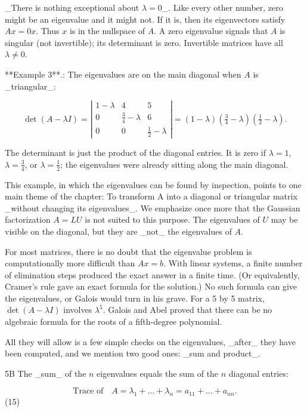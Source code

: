 _There is nothing exceptional about \(\lambda=0\)_. Like every other number, zero might be an eigenvalue and it might not. If it is, then its eigenvectors satisfy \(Ax=0x\). Thus \(x\) is in the nullspace of \(A\). A zero eigenvalue signals that \(A\) is singular (not invertible); its determinant is zero. Invertible matrices have all \(\lambda\neq 0\).

**Example 3**.: The eigenvalues are on the main diagonal when \(A\) is _triangular_:

\[\det(A-\lambda I)=\left|\begin{matrix}1-\lambda&4&5\\ 0&\frac{3}{4}-\lambda&6\\ 0&0&\frac{1}{2}-\lambda\end{matrix}\right|=(1-\lambda)(\tfrac{3}{4}-\lambda)( \tfrac{1}{2}-\lambda).\]

The determinant is just the product of the diagonal entries. It is zero if \(\lambda=1\), \(\lambda=\tfrac{3}{4}\), or \(\lambda=\tfrac{1}{2}\); the eigenvalues were already sitting along the main diagonal.

This example, in which the eigenvalues can be found by inspection, points to one main theme of the chapter: To transform A into a diagonal or triangular matrix _without changing its eigenvalues_. We emphasize once more that the Gaussian factorization \(A=LU\) is not suited to this purpose. The eigenvalues of \(U\) may be visible on the diagonal, but they are _not_ the eigenvalues of \(A\).

For most matrices, there is no doubt that the eigenvalue problem is computationally more difficult than \(Ax=b\). With linear systems, a finite number of elimination steps produced the exact answer in a finite time. (Or equivalently, Cramer's rule gave an exact formula for the solution.) No such formula can give the eigenvalues, or Galois would turn in his grave. For a 5 by 5 matrix, \(\det(A-\lambda I)\) involves \(\lambda^{5}\). Galois and Abel proved that there can be no algebraic formula for the roots of a fifth-degree polynomial.

All they will allow is a few simple checks on the eigenvalues, _after_ they have been computed, and we mention two good ones: _sum and product_.

5B The _sum_ of the \(n\) eigenvalues equals the sum of the \(n\) diagonal entries:

\[\text{Trace of}\quad A=\lambda_{1}+\dots+\lambda_{n}=a_{11}+\dots+a_{nn}.\] (15)

